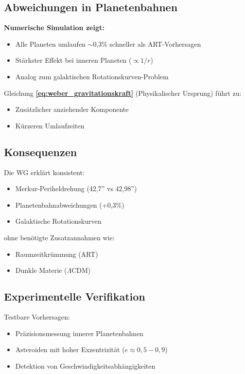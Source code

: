 \subsection{Abweichungen in Planetenbahnen}
\textbf{Numerische Simulation zeigt:}
\begin{itemize}
\item Alle Planeten umlaufen $\sim$0,3\% schneller als ART-Vorhersagen
\item Stärkster Effekt bei inneren Planeten ($\propto 1/r$)
\item Analog zum galaktischen Rotationskurven-Problem
\end{itemize}

Gleichung \textbf{\ref{eq:weber_gravitationskraft}} (Physikalischer Ursprung) führt zu:
\begin{itemize}
\item Zusätzlicher anziehender Komponente
\item Kürzeren Umlaufzeiten
\end{itemize}

\subsection{Konsequenzen}
Die WG erklärt konsistent:
\begin{itemize}
\item Merkur-Periheldrehung (42,7'' vs 42,98'')
\item Planetenbahnabweichungen (+0,3\%)
\item Galaktische Rotationskurven
\end{itemize}

ohne benötigte Zusatzannahmen wie:
\begin{itemize}
\item Raumzeitkrümmung (ART)
\item Dunkle Materie ($\Lambda$CDM)
\end{itemize}

\subsection{Experimentelle Verifikation}
Testbare Vorhersagen:
\begin{itemize}
\item Präzisionsmessung innerer Planetenbahnen
\item Asteroiden mit hoher Exzentrizität ($e \approx 0,5-0,9$)
\item Detektion von Geschwindigkeitsabhängigkeiten
\end{itemize}

